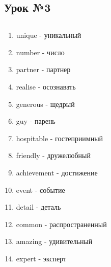 \subsection{Урок №3}

\subsection*{}
\begin{multicols}{2}
    \begin{enumerate}\setlength{\itemsep}{0pt}
        \item unique - уникальный
        \item number - число
        \item partner - партнер
        \item realise - осознавать
        \item generous - щедрый
        \item guy - парень
        \item hospitable - гостеприимный
        \item friendly - дружелюбный
        \item achievement - достижение
        \item event - событие
        \item detail - деталь
        \item common - распространенный
        \item amazing - удивительный
        \item expert - эксперт
    \end{enumerate}
\end{multicols}

\subsection*{}

\begin{verbatim}
\end{verbatim}